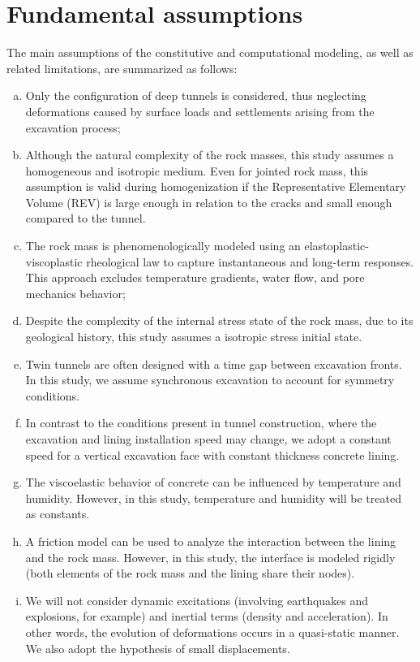 \documentclass[a4paper,fleqn]{cas-sc}
\begin{document}
\section{Fundamental assumptions}\label{}

The main assumptions of the constitutive and computational modeling, as well as related limitations, are summarized as follows:

\begin{enumerate}[(a)]
	\item Only the configuration of deep tunnels is considered, thus neglecting deformations caused by surface loads and settlements arising from the excavation process;

	\item Although the natural complexity of the rock masses, this study assumes a homogeneous and isotropic medium. Even for jointed rock mass, this assumption is valid during homogenization if the Representative Elementary Volume (REV) is large enough in relation to the cracks and small enough compared to the tunnel.  
	
	\item The rock mass is phenomenologically modeled using an elastoplastic-viscoplastic rheological law to capture instantaneous and long-term responses. This approach excludes  temperature gradients, water flow, and pore mechanics behavior;

	\item Despite the complexity of the internal stress state of the rock mass, due to its geological history, this study assumes a isotropic stress initial state. 

	\item Twin tunnels are often designed with a time gap between excavation fronts. In this study, we assume synchronous excavation to account for symmetry conditions.

	\item In contrast to the conditions present in tunnel construction, where the excavation and lining installation speed may change, we adopt a constant speed for a vertical excavation face with constant thickness concrete lining.
	
	\item The viscoelastic behavior of concrete can be influenced by temperature and humidity. However, in this study, temperature and humidity will be treated as constants.
	
	\item A friction model can be used to analyze the interaction between the lining and the rock mass. However, in this study, the interface is modeled rigidly (both elements of the rock mass and the lining share their nodes).

	\item We will not consider dynamic excitations (involving earthquakes and explosions, for example) and inertial terms (density and acceleration). In other words, the evolution of deformations occurs in a quasi-static manner. We also adopt the hypothesis of small displacements.
\end{enumerate}
\end{document}
